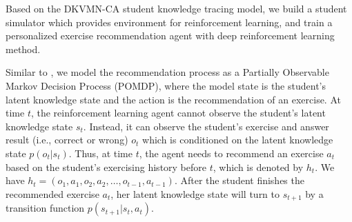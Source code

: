 \documentclass{edm_template}
\begin{document}
Based on the DKVMN-CA student knowledge tracing model, we build a student simulator which provides environment for reinforcement learning, and train a personalized exercise recommendation agent with deep reinforcement learning method.

Similar to \cite{acc}, we model the recommendation process as a Partially Observable Markov Decision Process (POMDP), where
the model state is the student's latent knowledge state and the action is the recommendation of an exercise.
At time $t$, the reinforcement learning agent cannot observe the student's latent knowledge state $s_t$. Instead, it can observe the student's exercise and answer result (i.e., correct or wrong) $o_t$ which is conditioned on the latent knowledge state $p(o_t|s_t)$. Thus, at time $t$, the agent needs to recommend an exercise $a_t$ based on the student's exercising history before $t$, which is denoted by $h_t$. We have $h_t = (o_1, a_1, o_2, a_2, \dots, o_{t-1}, a_{t-1})$. After the student finishes the recommended exercise $a_t$, her latent knowledge state will turn to $s_{t+1}$ by a transition function $p(s_{t+1}|s_t, a_t)$.
\end{document}
